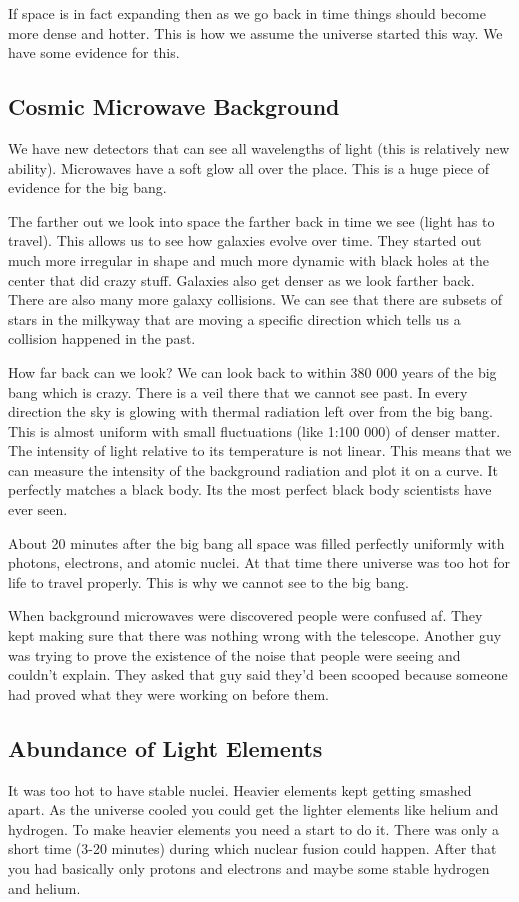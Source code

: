 \documentclass{article}
\begin{document}
If space is in fact expanding then as we go back in time things should become more dense and hotter. This is how we assume the universe started this way. We have some evidence for this.

\subsection{Cosmic Microwave Background}
\label{par:cosmic_microwave_background}
We have new detectors that can see all wavelengths of light (this is relatively new ability). Microwaves have a soft glow all over the place. This is a huge piece of evidence for the big bang.

The farther out we look into space the farther back in time we see (light has to travel). This allows us to see how galaxies evolve over time. They started out much more irregular in shape and much more dynamic with black holes at the center that did crazy stuff. Galaxies also get denser as we look farther back. There are also many more galaxy collisions. We can see that there are subsets of stars in the milkyway that are moving a specific direction which tells us a collision happened in the past.

How far back can we look? We can look back to within 380 000 years of the big bang which is crazy. There is a veil there that we cannot see past. In every direction the sky is glowing with thermal radiation left over from the big bang. This is almost uniform with small fluctuations (like  1:100 000) of denser matter.
The intensity of light relative to its temperature is not linear. This means that we can measure the intensity of the background radiation and plot it on a curve. It perfectly matches a black body. Its the most perfect black body scientists have ever seen.

About 20 minutes after the big bang all space was filled perfectly uniformly with photons, electrons, and atomic nuclei. At that time there universe was too hot for life to travel properly. This is why we cannot see to the big bang.

When background microwaves were discovered people were confused af. They kept making sure that there was nothing wrong with the telescope. Another guy was trying to prove the existence of the noise that people were seeing and couldn't explain. They asked that guy said they'd been scooped because someone had proved what they were working on before them.

\subsection*{Abundance of Light Elements}
\label{sub:abundance_of_light_elements}
It was too hot to have stable nuclei. Heavier elements kept getting smashed apart. As the universe cooled you could get the lighter elements like helium and hydrogen. To make heavier elements you need a start to do it. There was only a short time (3-20 minutes) during which nuclear fusion could happen. After that you had basically only protons and electrons and maybe some stable hydrogen and helium.
\end{document}

